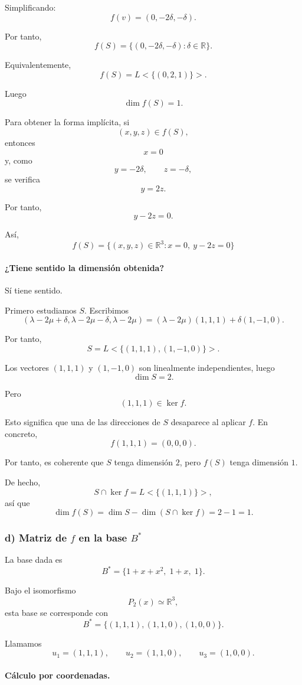 \documentclass[12pt]{article}
\begin{document}
Simplificando:
\[
f(v)=(0,-2\delta,-\delta).
\]

Por tanto,
\[
f(S)=\{(0,-2\delta,-\delta):\delta\in\mathbb{R}\}.
\]

Equivalentemente,
\[
f(S)=L<\{(0,2,1)\}>.
\]

Luego
\[
\dim f(S)=1.
\]

Para obtener la forma implícita, si
\[
(x,y,z)\in f(S),
\]
entonces
\[
x=0
\]
y, como
\[
y=-2\delta,
\qquad
z=-\delta,
\]
se verifica
\[
y=2z.
\]

Por tanto,
\[
y-2z=0.
\]

Así,
\[
\boxed{
f(S)=\{(x,y,z)\in\mathbb{R}^3:x=0,\ y-2z=0\}
}
\]

\paragraph{¿Tiene sentido la dimensión obtenida?}

Sí tiene sentido.

Primero estudiamos \(S\). Escribimos
\[
(\lambda-2\mu+\delta,\lambda-2\mu-\delta,\lambda-2\mu)
=
(\lambda-2\mu)(1,1,1)+\delta(1,-1,0).
\]

Por tanto,
\[
S=L<\{(1,1,1),(1,-1,0)\}>.
\]

Los vectores \((1,1,1)\) y \((1,-1,0)\) son linealmente independientes, luego
\[
\dim S=2.
\]

Pero
\[
(1,1,1)\in \ker f.
\]

Esto significa que una de las direcciones de \(S\) desaparece al aplicar \(f\). En concreto,
\[
f(1,1,1)=(0,0,0).
\]

Por tanto, es coherente que \(S\) tenga dimensión \(2\), pero \(f(S)\) tenga dimensión \(1\).

De hecho,
\[
S\cap \ker f=L<\{(1,1,1)\}>,
\]
así que
\[
\dim f(S)=\dim S-\dim(S\cap \ker f)=2-1=1.
\]

\subsubsection*{d) Matriz de \(f\) en la base \(B^*\)}

La base dada es
\[
B^*=\{1+x+x^2,\;1+x,\;1\}.
\]

Bajo el isomorfismo
\[
P_2(x)\simeq \mathbb{R}^3,
\]
esta base se corresponde con
\[
B^*=\{(1,1,1),(1,1,0),(1,0,0)\}.
\]

Llamamos
\[
u_1=(1,1,1),
\qquad
u_2=(1,1,0),
\qquad
u_3=(1,0,0).
\]

\paragraph{Cálculo por coordenadas.}
\end{document}

